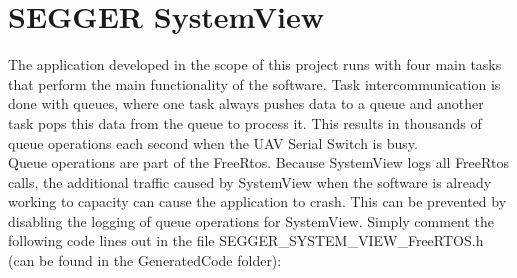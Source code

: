 \section{SEGGER SystemView}
The application developed in the scope of this project runs with four main tasks that perform the main functionality of the software. Task intercommunication is done with queues, where one task always pushes data to a queue and another task pops this data from the queue to process it. This results in thousands of queue operations each second when the UAV Serial Switch is busy.\\
Queue operations are part of the FreeRtos. Because SystemView logs all FreeRtos calls, the additional traffic caused by SystemView when the software is already working to capacity can cause the application to crash. This can be prevented by disabling the logging of queue operations for SystemView. Simply comment the following code lines out in the file SEGGER\_SYSTEM\_VIEW\_FreeRTOS.h (can be found in the GeneratedCode folder):\\
